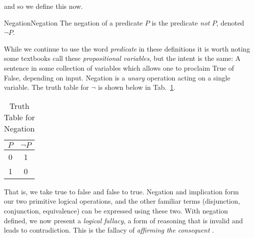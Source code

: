         and so we define this now.
        \begin{fdefinition}{Negation}{Negation}
            The negation of a \gls{predicate} $P$ is the predicate \textit{not}
            $P$, denoted $\neg{P}$.
        \end{fdefinition}
        While we continue to use the word \textit{predicate} in these
        definitions it is worth noting some textbooks call these
        \textit{propositional variables}, but the
        intent is the same: A sentence in some collection of variables which
        allows one to proclaim True of False, depending on input. Negation is a
        \textit{unary} operation acting on a single variable. The truth table
        for $\neg$ is shown below in Tab.~\ref{tab:Truth_Table_Negation}.
        \begin{table}[H]
            \centering
            \captionsetup{type=table}
            \begin{tabular}{c|c}
                $P$&$\neg{P}$\\
                \hline
                0&1\\
                1&0
            \end{tabular}
            \caption{Truth Table for Negation}
            \label{tab:Truth_Table_Negation}
        \end{table}
        That is, we take true to false and false to true. Negation and
        implication form our two primitive logical operations, and the other
        familiar terms (disjunction, conjunction, equivalence) can be expressed
        using these two. With negation defined, we now present a
        \textit{logical fallacy}, a form of reasoning
        that is invalid and leads to contradiction. This is the fallacy of
        \textit{affirming the consequent}%
        .
